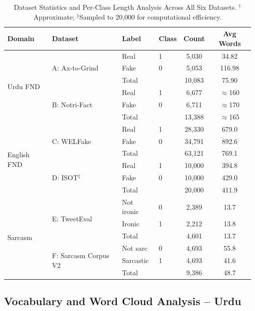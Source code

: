 \documentclass[conference]{IEEEtran}
\begin{document}
\begin{table}[!htb]
\centering
\caption{Dataset Statistics and Per-Class Length Analysis Across All Six Datasets.
$^{\dagger}$Approximate; $^{\ddagger}$Sampled to 20,000 for computational efficiency.}
\label{tab:dataset_stats}
\setlength{\tabcolsep}{4pt}
\begin{tabular}{llllcc}
\toprule
\textbf{Domain} & \textbf{Dataset} & \textbf{Label} & \textbf{Class} &
\textbf{Count} & \textbf{Avg Words} \\
\midrule
\multirow{6}{*}{Urdu FND}
  & \multirow{3}{*}{A: Ax-to-Grind}
    & Real  & 1 & 5,030  & 34.82 \\
  & & Fake  & 0 & 5,053  & 116.98 \\
  & & Total &   & 10,083 & 75.90 \\
\cmidrule{2-6}
  & \multirow{3}{*}{B: Notri-Fact}
    & Real  & 1 & 6,677  & $\approx$160 \\
  & & Fake  & 0 & 6,711  & $\approx$170 \\
  & & Total &   & 13,388 & $\approx$165 \\
\midrule
\multirow{6}{*}{English FND}
  & \multirow{3}{*}{C: WELFake}
    & Real  & 1 & 28,330 & 679.0 \\
  & & Fake  & 0 & 34,791 & 892.6 \\
  & & Total &   & 63,121 & 769.1 \\
\cmidrule{2-6}
  & \multirow{3}{*}{D: ISOT$^{\ddagger}$}
    & Real  & 1 & 10,000 & 394.8 \\
  & & Fake  & 0 & 10,000 & 429.0 \\
  & & Total &   & 20,000 & 411.9 \\
\midrule
\multirow{6}{*}{Sarcasm}
  & \multirow{3}{*}{E: TweetEval}
    & Not ironic & 0 & 2,389 & 13.7 \\
  & & Ironic     & 1 & 2,212 & 13.8 \\
  & & Total      &   & 4,601 & 13.7 \\
\cmidrule{2-6}
  & \multirow{3}{*}{F: Sarcasm Corpus V2}
    & Not sarc   & 0 & 4,693 & 55.8 \\
  & & Sarcastic  & 1 & 4,693 & 41.6 \\
  & & Total      &   & 9,386 & 48.7 \\
\bottomrule
\end{tabular}
\end{table}

\subsection{Vocabulary and Word Cloud Analysis -- Urdu}
\label{sec:vocab}
\end{document}
